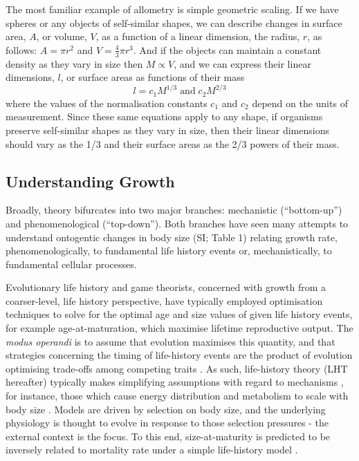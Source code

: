 \documentclass[a4paper]{article} %
\begin{document}
        The most familiar example of allometry is simple geometric scaling. If we have spheres or any objects of self-similar shapes, we can describe changes in surface area, $A$, or volume, $V$, as a function of a linear dimension, the radius, $r$, as follows: $A = \pi r^2$ and $V = \frac{4}{3}\pi r^3$. And if the objects can maintain a constant density as they vary in size then $M \propto V$, and we can express their linear dimensions, $l$, or surface areas as functions of their mass
        \begin{equation*}
            l = c_{1}M^{1/3} \; \text{and} \; c_{2}M^{2/3}
        \end{equation*}
        where the values of the normalisation constants $c_1$ and $c_2$ depend on the units of measurement. Since these same equations apply to any shape, if organisms preserve self-similar shapes as they vary in size, then their linear dimensions should vary as the 1/3 and their surface areas as the 2/3 powers of their mass.

        \subsection{Understanding Growth}
        Broadly, theory bifurcates into two major branches: mechanistic (``bottom-up'') and phenomenological (``top-down''). Both branches have seen many attempts to understand ontogentic changes in body size (SI; Table 1) relating growth rate, phenomenologically, to fundamental life history events or, mechanistically, to fundamental cellular processes.   
        
        Evolutionary life history and game theorists, concerned with growth from a coarser-level, life history perspective, have typically employed optimisation techniques to solve for the optimal age and size values of given life history events, for example age-at-maturation, which maximise lifetime reproductive output. The \textit{modus operandi} is to assume that evolution maximises this quantity, and that strategies concerning the timing of life-history events are the product of evolution optimising trade-offs among competing traits \autocite{Day1997, Stearns1989, stearns1992evolution}. As such, life-history theory (LHT hereafter) typically makes simplifying assumptions with regard to mechanisms \autocite{Day1997, Kozowski1987-indeterminate}, for instance, those which cause energy distribution and metabolism to scale with body size \autocite{peters1983,Werner1988,brown2000-scaling-book}. Models are driven by selection on body size, and the underlying physiology is thought to evolve in response to those selection pressures - the external context is the focus. To this end, size-at-maturity is predicted to be inversely related to mortality rate under a simple life-history model \autocite{stearns1992evolution}.
        
\end{document}

